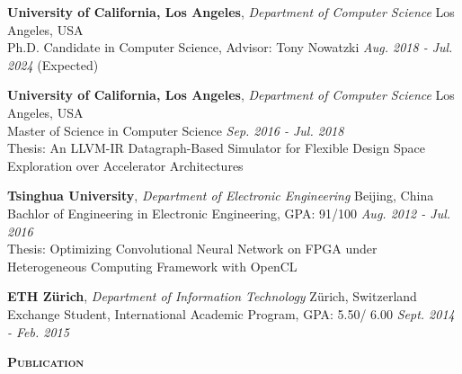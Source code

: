 \documentclass[a4paper]{article}
\newenvironment{changemargin}[2]{%
  \begin{list}{}{%
    \setlength{\topsep}{0pt}%
    \setlength{\leftmargin}{#1}%
    \setlength{\rightmargin}{#2}%
    \setlength{\listparindent}{\parindent}%
    \setlength{\itemindent}{\parindent}%
    \setlength{\parsep}{\parskip}%
  }%
  \item[]}{\end{list}
}
\newcommand{\lineover}{
	\begin{changemargin}{-0.05in}{-0.05in}
		\vspace*{-8pt}
		\hrulefill \\
		\vspace*{-2pt}
	\end{changemargin}
}
\newcommand{\header}[1]{
	\begin{changemargin}{-0.5in}{-0.5in}
		\scshape{\large \textbf{#1}}\\
  	\lineover
	\end{changemargin}
}
\newenvironment{body} {
	\vspace*{-16pt}
	\begin{changemargin}{-0.5in}{-0.5in}
  }	
	{\end{changemargin}
}
\begin{document}
\begin{body}
	\vspace{14pt}

	\textbf{University of California, Los Angeles}, \emph{Department of Computer Science} \hfill Los Angeles, USA \\
Ph.D. Candidate in Computer Science, Advisor: Tony Nowatzki \hfill \emph{Aug. 2018 - Jul. 2024} (Expected){} \\

\vspace{6pt}

	\textbf{University of California, Los Angeles}, \emph{Department of Computer Science} \hfill Los Angeles, USA \\
Master of Science in Computer Science \hfill \emph{Sep. 2016 - Jul. 2018}{} \\
Thesis: An LLVM-IR Datagraph-Based Simulator for Flexible Design Space Exploration over Accelerator Architectures \\

\vspace{6pt}

	\textbf{Tsinghua University}, \emph{Department of Electronic Engineering} \hfill Beijing, China \\
Bachlor of Engineering in Electronic Engineering, GPA: 91/100 \hfill \emph{Aug. 2012 - Jul. 2016}{} \\
Thesis: Optimizing Convolutional Neural Network on FPGA under Heterogeneous Computing Framework with OpenCL \\
\vspace{6pt}

	\textbf{ETH Z\"urich}, \emph{Department of Information Technology} \hfill Z\"urich, Switzerland \\
	Exchange Student, International Academic Program, GPA: 5.50/ 6.00 \hfill \emph{Sept. 2014 - Feb. 2015}{} \\

\end{body}

\smallskip
\smallskip

\header{Publication}
\end{document}
